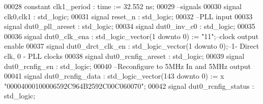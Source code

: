 \begin{DoxyCode}
00028    \textcolor{keywordflow}{constant} \textcolor{vhdlchar}{clk1_period}    \textcolor{vhdlchar}{:} \textcolor{comment}{time} \textcolor{vhdlchar}{:=} \textcolor{vhdllogic}{}\textcolor{vhdllogic}{32}.\textcolor{vhdllogic}{552} \textcolor{vhdlchar}{ns}; 
00029 \textcolor{keyword}{   --signals}
00030    \textcolor{keywordflow}{signal} \textcolor{vhdlchar}{clk0}\textcolor{vhdlchar}{,}\textcolor{vhdlchar}{clk1}        \textcolor{vhdlchar}{:} \textcolor{comment}{std\_logic};
00031    \textcolor{keywordflow}{signal} \textcolor{vhdlchar}{reset_n}          \textcolor{vhdlchar}{:} \textcolor{comment}{std\_logic}; 
00032 \textcolor{keyword}{      --PLL input }
00033    \textcolor{keywordflow}{signal} \textcolor{vhdlchar}{dut0_pll_areset}  \textcolor{vhdlchar}{:} \textcolor{comment}{std\_logic};
00034    \textcolor{keywordflow}{signal} \textcolor{vhdlchar}{dut0_inv_c0}      \textcolor{vhdlchar}{:} \textcolor{comment}{std\_logic};
00035 
00036    \textcolor{keywordflow}{signal} \textcolor{vhdlchar}{dut0_clk_ena}           \textcolor{vhdlchar}{:} \textcolor{comment}{std\_logic\_vector}\textcolor{vhdlchar}{(}\textcolor{vhdllogic}{}\textcolor{vhdllogic}{1} \textcolor{keywordflow}{downto} \textcolor{vhdllogic}{}\textcolor{vhdllogic}{0}\textcolor{vhdlchar}{)} \textcolor{vhdlchar}{:=} \textcolor{vhdllogic}{"11"};\textcolor{keyword}{--clock output enable}
00037    \textcolor{keywordflow}{signal} \textcolor{vhdlchar}{dut0_drct_clk_en}       \textcolor{vhdlchar}{:} \textcolor{comment}{std\_logic\_vector}\textcolor{vhdlchar}{(}\textcolor{vhdllogic}{}\textcolor{vhdllogic}{1} \textcolor{keywordflow}{downto} \textcolor{vhdllogic}{}\textcolor{vhdllogic}{0}\textcolor{vhdlchar}{)};\textcolor{keyword}{--1- Direct clk, 0 - PLL clocks }
00038    \textcolor{keywordflow}{signal} \textcolor{vhdlchar}{dut0_rcnfig_areset}     \textcolor{vhdlchar}{:} \textcolor{comment}{std\_logic};
00039    \textcolor{keywordflow}{signal} \textcolor{vhdlchar}{dut0_rcnfig_en}         \textcolor{vhdlchar}{:} \textcolor{comment}{std\_logic};
00040 \textcolor{keyword}{   --Reconfigure to 5MHz In and 5MHz output }
00041    \textcolor{keywordflow}{signal} \textcolor{vhdlchar}{dut0_rcnfig_data}       \textcolor{vhdlchar}{:} \textcolor{comment}{std\_logic\_vector}\textcolor{vhdlchar}{(}\textcolor{vhdllogic}{}\textcolor{vhdllogic}{143} \textcolor{keywordflow}{downto} \textcolor{vhdllogic}{}\textcolor{vhdllogic}{0}\textcolor{vhdlchar}{)} \textcolor{vhdlchar}{:=} \textcolor{vhdlchar}{x}\textcolor{vhdllogic}{
      "00004000100006592C964B2592C00C060070"};
00042    \textcolor{keywordflow}{signal} \textcolor{vhdlchar}{dut0_rcnfig_status}     \textcolor{vhdlchar}{:} \textcolor{comment}{std\_logic};

\end{DoxyCode}
